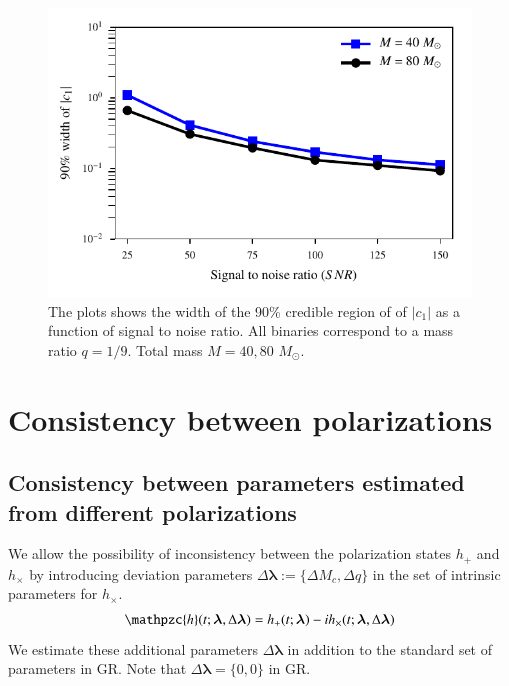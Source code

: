 \documentclass[prd,preprintnumbers,twocolumn,eqsecnum,floatfix,a4paper,nofootinbib,superscriptaddress]{revtex4}
\newcommand{\h}{\mathpzc{h}}
\newcommand{\blambda}{\bm{\lambda}}
\begin{document}
\newpage
\begin{figure}[h]
    \begin{center}
    \includegraphics[scale=0.75]{figs/confidence_interval_c1_varying_snr.pdf} 
    \end{center} 
    \caption{The plots shows the width of the 90\% credible region of of $|c_1|$ as a function of signal to noise ratio. All binaries correspond to a mass ratio $q = 1/9$. Total mass $M={40,80}$ $M_{\odot}$.}
    \label{fig:c1_bound_c}
\end{figure}

\newpage
\section{Consistency between polarizations}
\label{sec4}
\subsection{Consistency between parameters estimated from different polarizations}

We allow the possibility of inconsistency between the polarization states $h_+$ and $h_\times$ by introducing deviation parameters  $\Delta \blambda := \{\Delta M_c, \Delta q\}$ in the set of intrinsic parameters for $h_\times$.
\begin{eqnarray} 
\h(t; \blambda, \Delta \blambda) =  h_+(t; \blambda) - ih_\times(t; \blambda, \Delta \blambda)
\label{eq:test_hp_hc}
\end{eqnarray}
We estimate these additional parameters $\Delta \blambda$ in addition to the standard set of parameters in GR. Note that $\Delta \blambda = \{0,0\}$ in GR.
\end{document}
